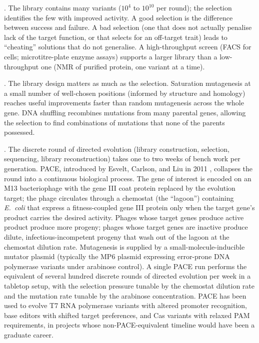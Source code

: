 . The library
contains many variants ($10^4$ to $10^{10}$ per round); the
selection identifies the few with improved activity. A good
selection is the difference between success and failure. A bad
selection (one that does not actually penalise lack of the target
function, or that selects for an off-target trait) leads to
``cheating'' solutions that do not generalise. A high-throughput
screen (FACS for cells; microtitre-plate enzyme assays) supports a
larger library than a low-throughput one (NMR of purified protein,
one variant at a time).

. The library design matters as
much as the selection. Saturation mutagenesis at a small number of
well-chosen positions (informed by structure and homology) reaches
useful improvements faster than random mutagenesis across the whole
gene. DNA shuffling \cite[pp.~389--391]{paper:v6c09-stemmer-shuffling-1994}
recombines mutations from many parental genes, allowing the
selection to find combinations of mutations that none of the
parents possessed.

. The discrete
round of directed evolution (library construction, selection,
sequencing, library reconstruction) takes one to two weeks of
bench work per generation. PACE, introduced by Esvelt, Carlson, and
Liu in 2011 \cite[pp.~499--503]{paper:v6c09-esvelt-pace-2011},
collapses the round into a continuous biological process. The gene
of interest is encoded on an M13 bacteriophage with the gene III
coat protein replaced by the evolution target; the phage circulates
through a chemostat (the ``lagoon'') containing \emph{E.\ coli} that
express a fitness-coupled gene III protein only when the target
gene's product carries the desired activity. Phages whose target
genes produce active product produce more progeny; phages whose
target genes are inactive produce dilute, infectious-incompetent
progeny that wash out of the lagoon at the chemostat dilution rate.
Mutagenesis is supplied by a small-molecule-inducible mutator
plasmid (typically the MP6 plasmid expressing error-prone DNA
polymerase variants under arabinose control). A single PACE run
performs the equivalent of several hundred discrete rounds of
directed evolution per week in a tabletop setup, with the
selection pressure tunable by the chemostat dilution rate and the
mutation rate tunable by the arabinose concentration. PACE has
been used to evolve T7 RNA polymerase variants with altered
promoter recognition, base editors with shifted target preferences,
and Cas variants with relaxed PAM requirements, in projects whose
non-PACE-equivalent timeline would have been a graduate career.

